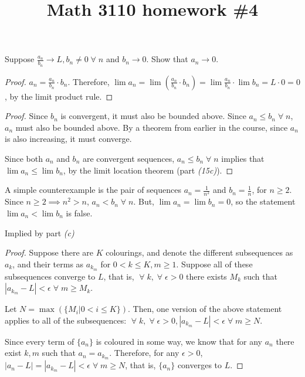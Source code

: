 

\title{Math 3110 homework \#4}
\author{\name}
\maketitle

Suppose $\frac{a_n}{b_n} \rightarrow L, b_n \neq 0 \;\forall\; n$ and $b_n \rightarrow 0$. Show that $a_n \rightarrow 0$.

\begin{proof}
  $a_n = \frac{a_n}{b_n} \cdot b_n$. Therefore, $\lim a_n = \lim \left(\frac{a_n}{b_n} \cdot b_n\right) = \lim \frac{a_n}{b_n} \cdot \lim b_n = L \cdot 0 = 0$, by the limit product rule.
\end{proof}


\begin{proof}
  Since $b_n$ is convergent, it must also be bounded above. Since $a_n \leq b_n \;\forall\; n$, $a_n$ must also be bounded above. By a theorem from earlier in the course, since $a_n$ is also increasing, it must converge.

  Since both $a_n$ and $b_n$ are convergent sequences, $a_n \leq b_n \;\forall\; n$ implies that $\lim a_n \leq \lim b_n$, by the limit location theorem (part \textit{(15c)}).
\end{proof}

A simple counterexample is the pair of sequences $a_n = \frac{1}{n^2}$ and $b_n = \frac{1}{n}$, for $n \geq 2$. Since $n \geq 2 \implies n^2 > n$, $a_n < b_n \;\forall\; n$. But, $\lim a_n = \lim b_n = 0$, so the statement $\lim a_n < \lim b_n$ is false.


 
Implied by part \textit{(c)}

\begin{proof}
  Suppose there are $K$ colourings, and denote the different subsequences as $a_k$, and their terms as $a_{k_m}$ for $0 < k \leq K, m \geq 1$. Suppose all of these subsequences converge to $L$, that is, $\;\forall\;k, \;\forall\; \epsilon > 0$ there exists $M_k$ such that $|a_{k_m} - L| < \epsilon \;\forall\; m \geq M_k$.

  Let $N = \max(\{M_i | 0 < i \leq K\})$. Then, one version of the above statement applies to all of the subsequences: $\;\forall\;k, \;\forall\; \epsilon > 0, |a_{k_m} - L| < \epsilon \;\forall\; m \geq N$.

  Since every term of $\{a_n\}$ is coloured in some way, we know that for any $a_n$ there exist $k, m$ such that $a_n = a_{k_m}$. Therefore, for any $\epsilon > 0$, $|a_n - L| = |a_{k_m} - L| < \epsilon \;\forall\; m \geq N$, that is, $\{a_n\}$ converges to $L$.
\end{proof}

